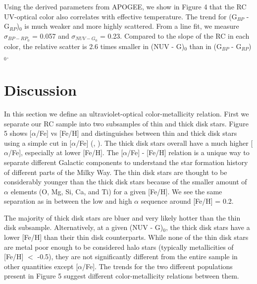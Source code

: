 \documentclass[twocolumn]{emulateapj}
\begin{document}
Using the derived parameters from APOGEE, we show in Figure 4 that the RC UV-optical color also correlates with effective temperature. The trend for (G$_{BP}$ - G$_{RP}$)$_0$ is much weaker and more highly scattered. From a line fit, we measure $\sigma_{{BP-RP}_0}$ = 0.057 and $\sigma_{{NUV-G}_0}$ = 0.23. Compared to the slope of the RC in each color, the relative scatter is 2.6 times smaller in (NUV - G)$_0$ than in (G$_{BP}$ - G$_{RP}$)$_0$. 





\section{Discussion}
In this section we define an ultraviolet-optical color-metallicity relation. First we separate our RC sample into two subsamples of thin and thick disk stars. Figure 5 shows [$\alpha$/Fe] vs [Fe/H] and distinguishes between thin and thick disk stars using a simple cut in [$\alpha$/Fe] (\citealt{hawkins15}, \citealt{nidever14}). The thick disk stars overall have a much higher [$\alpha$/Fe], especially at lower [Fe/H]. The [$\alpha$/Fe] - [Fe/H] relation is a unique way to separate different Galactic components to understand the star formation history of different parts of the Milky Way. The thin disk stars are thought to be considerably younger than the thick disk stars because of the smaller amount of $\alpha$ elements (O, Mg, Si, Ca, and Ti) for a given [Fe/H]. We see the same separation as in \citealt{nidever14} between the low and high $\alpha$ sequence around [Fe/H] = 0.2. 

The majority of thick disk stars are bluer and very likely hotter than the thin disk subsample. Alternatively, at a given (NUV - G)$_0$, the thick disk stars have a lower [Fe/H] than their thin disk counterparts. While none of the thin disk stars are metal poor enough to be considered halo stars (typically metallicities of [Fe/H] $<$ -0.5), they are not significantly different from the entire sample in other quantities except [$\alpha$/Fe]. The trends for the two different populations present in Figure 5 suggest different color-metallicity relations between them.
\end{document}

